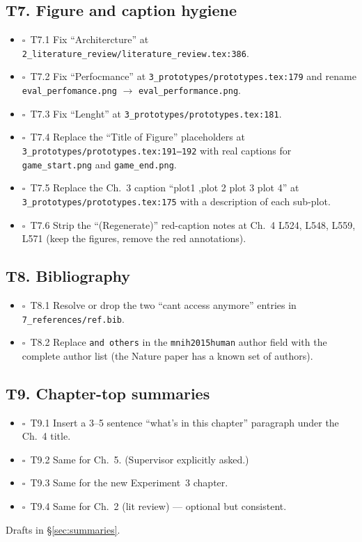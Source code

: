 \documentclass[11pt,a4paper]{article}
\newcommand{\todoitem}{$\square$~}
\newcommand{\fileline}[1]{\texttt{\small #1}}
\begin{document}
\subsection*{T7. Figure and caption hygiene}

\begin{itemize}[leftmargin=*,itemsep=2pt]
  \item \todoitem T7.1 Fix ``Architercture'' at
  \fileline{2\_literature\_review/literature\_review.tex:386}.
  \item \todoitem T7.2 Fix ``Perfocmance'' at
  \fileline{3\_prototypes/prototypes.tex:179} and rename
  \fileline{eval\_perfomance.png} $\to$ \fileline{eval\_performance.png}.
  \item \todoitem T7.3 Fix ``Lenght'' at
  \fileline{3\_prototypes/prototypes.tex:181}.
  \item \todoitem T7.4 Replace the ``Title of Figure'' placeholders at
  \fileline{3\_prototypes/prototypes.tex:191--192} with real captions
  for \fileline{game\_start.png} and \fileline{game\_end.png}.
  \item \todoitem T7.5 Replace the Ch.~3 caption ``plot1 ,plot 2 plot 3
  plot 4'' at \fileline{3\_prototypes/prototypes.tex:175} with a
  description of each sub-plot.
  \item \todoitem T7.6 Strip the ``(Regenerate)'' red-caption notes at
  Ch.~4 L524, L548, L559, L571 (keep the figures, remove the red
  annotations).
\end{itemize}

\subsection*{T8. Bibliography}

\begin{itemize}[leftmargin=*,itemsep=2pt]
  \item \todoitem T8.1 Resolve or drop the two ``cant access anymore''
  entries in \fileline{7\_references/ref.bib}.
  \item \todoitem T8.2 Replace \texttt{and others} in the
  \fileline{mnih2015human} author field with the complete author list
  (the Nature paper has a known set of authors).
\end{itemize}

\subsection*{T9. Chapter-top summaries}

\begin{itemize}[leftmargin=*,itemsep=2pt]
  \item \todoitem T9.1 Insert a 3--5 sentence ``what's in this chapter''
  paragraph under the Ch.~4 title.
  \item \todoitem T9.2 Same for Ch.~5. (Supervisor explicitly asked.)
  \item \todoitem T9.3 Same for the new Experiment~3 chapter.
  \item \todoitem T9.4 Same for Ch.~2 (lit review) --- optional but
  consistent.
\end{itemize}
Drafts in \S\ref{sec:summaries}.
\end{document}
